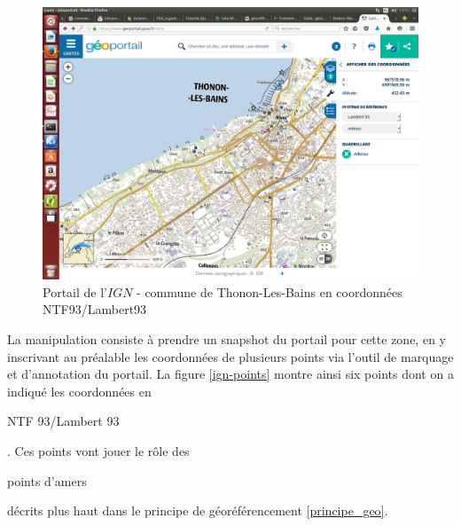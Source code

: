 \documentclass{book}
\begin{document}
\begin{figure}[H]
\begin{center}
\includegraphics[scale=0.3]{images/georeferencing/ign-portail-Thonon.png}
\end{center}
\caption{Portail de l'$IGN$ - commune de Thonon-Les-Bains en coordonnées NTF93/Lambert93 \cite{ign-portail}}
\label{ign-portail}
\end{figure}

\clearpage

La manipulation consiste à prendre un snapshot du portail pour cette zone, en y inscrivant au préalable les coordonnées de 
plusieurs points via l'outil de marquage et d'annotation du portail. La figure \ref{ign-points} montre ainsi six points 
dont on a indiqué les coordonnées en \begin{itshape}NTF 93/Lambert 93\end{itshape}. Ces points vont jouer le rôle des 
\begin{itshape}points d'amers\end{itshape} décrits plus haut dans le principe de géoréférencement \ref{principe_geo}.
\end{document}
